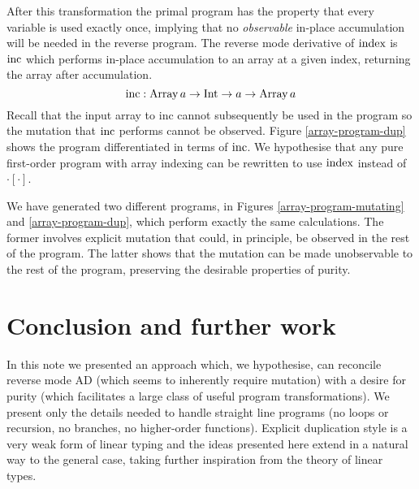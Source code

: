 \documentclass[12pt]{article}
\begin{document}
After this transformation the primal program has the property that
every variable is used exactly once, implying that no
\emph{observable} in-place accumulation will be needed in the reverse
program.  The reverse mode derivative of $\mathrm{index}$ is $\mathrm{inc}$ which
performs in-place accumulation to an array at a given index, returning the array
after accumulation.
\[
\mathrm{inc} : \mathrm{Array} \, a \to \mathrm{Int} \to a \to \mathrm{Array}
\, a
\]
Recall that the input array to $\textrm{inc}$
cannot subsequently be used in the program so the mutation that
$\mathrm{inc}$ performs cannot be observed.  Figure \ref{array-program-dup}
shows the program differentiated in terms of $\mathrm{inc}$.
We hypothesise that any pure first-order program with array indexing
can be rewritten to use $\mathrm{index}$ instead of $\cdot[\cdot]$.

We have generated two different programs, in Figures
\ref{array-program-mutating} and \ref{array-program-dup}, which
perform exactly the same calculations.  The former involves explicit
mutation that could, in principle, be observed in the rest of the
program.  The latter shows that the mutation can be made unobservable
to the rest of the program, preserving the desirable properties of
purity.

\section{Conclusion and further work}

In this note we presented an approach which, we hypothesise, can
reconcile reverse mode AD (which seems to inherently require mutation)
with a desire for purity (which facilitates a large class of useful
program transformations).  We present only the details needed to
handle straight line programs (no loops or recursion, no branches, no
higher-order functions).  Explicit duplication style is a very weak
form of linear typing and the ideas presented here extend in a natural
way to the general case, taking further inspiration from the theory of
linear types.



\end{document}
